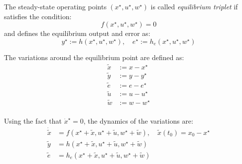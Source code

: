 \documentclass[]{report}
\begin{document}
	The steady-state operating points \((x^\star, u^\star, w^\star)\) is called \textit{equilibrium triplet} if satisfies the condition:
	\begin{equation}
		\label{eq:equilibrium_triplet}
		f(x^\star, u^\star, w^\star) = 0
	\end{equation}
	and defines the equilibrium output and error as:
	\begin{equation}
		\label{eq:equilibrium_output_error}
		y^\star := h(x^\star, u^\star, w^\star), \quad e^\star := h_e(x^\star, u^\star, w^\star)
	\end{equation}
	
	The variations around the equilibrium point are defined as:
	\begin{equation}
		\label{eq:variations}
		\begin{aligned}
			\tilde{x} &:= x - x^\star \\
			\tilde{y} &:= y - y^\star \\
			\tilde{e} &:= e - e^\star \\
			\tilde{u} &:= u - u^\star \\
			\tilde{w} &:= w - w^\star \\
		\end{aligned}
	\end{equation}
	
	Using the fact that \(\dot{x}^\star = 0\), the dynamics of the variations are:
	\begin{equation}
		\label{eq:variation_dynamics}
		\begin{aligned}
			\dot{\tilde{x}} &= f(x^\star + \tilde{x}, u^\star + \tilde{u}, w^\star + \tilde{w}), \quad \tilde{x}(t_0) = x_0 - x^\star \\
			\tilde{y} &= h(x^\star + \tilde{x}, u^\star + \tilde{u}, w^\star + \tilde{w}) \\
			\tilde{e} &= h_e(x^\star + \tilde{x}, u^\star + \tilde{u}, w^\star + \tilde{w})
		\end{aligned}
	\end{equation}
	
\end{document}

